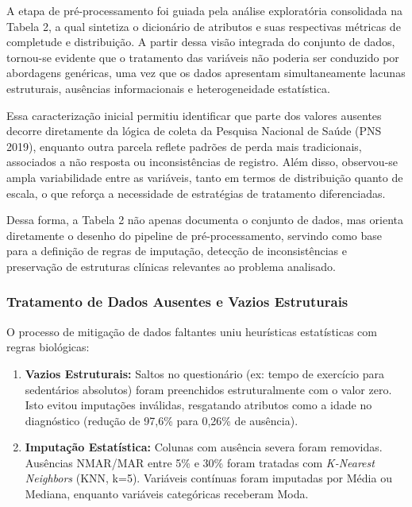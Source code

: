 \documentclass[12pt, a4paper]{article}
\begin{document}
    A etapa de pré-processamento foi guiada pela análise exploratória consolidada na Tabela 2, a qual sintetiza o dicionário de atributos e suas respectivas métricas de completude e distribuição. A partir dessa visão integrada do conjunto de dados, tornou-se evidente que o tratamento das variáveis não poderia ser conduzido por abordagens genéricas, uma vez que os dados apresentam simultaneamente lacunas estruturais, ausências informacionais e heterogeneidade estatística.

    Essa caracterização inicial permitiu identificar que parte dos valores ausentes decorre diretamente da lógica de coleta da Pesquisa Nacional de Saúde (PNS 2019), enquanto outra parcela reflete padrões de perda mais tradicionais, associados a não resposta ou inconsistências de registro. Além disso, observou-se ampla variabilidade entre as variáveis, tanto em termos de distribuição quanto de escala, o que reforça a necessidade de estratégias de tratamento diferenciadas.
    
    Dessa forma, a Tabela 2 não apenas documenta o conjunto de dados, mas orienta diretamente o desenho do pipeline de pré-processamento, servindo como base para a definição de regras de imputação, detecção de inconsistências e preservação de estruturas clínicas relevantes ao problema analisado.

    \subsubsection{Tratamento de Dados Ausentes e Vazios Estruturais}

    O processo de mitigação de dados faltantes uniu heurísticas estatísticas com regras biológicas:
    \begin{enumerate}
        \item \textbf{Vazios Estruturais:} Saltos no questionário (ex: tempo de exercício para sedentários absolutos) foram preenchidos estruturalmente com o valor zero. Isto evitou imputações inválidas, resgatando atributos como a idade no diagnóstico (redução de 97,6\% para 0,26\% de ausência).
        \item \textbf{Imputação Estatística:} Colunas com ausência severa foram removidas. Ausências NMAR/MAR entre 5\% e 30\% foram tratadas com \textit{K-Nearest Neighbors} (KNN, k=5). Variáveis contínuas foram imputadas por Média ou Mediana, enquanto variáveis categóricas receberam Moda.
    \end{enumerate}
\end{document}
